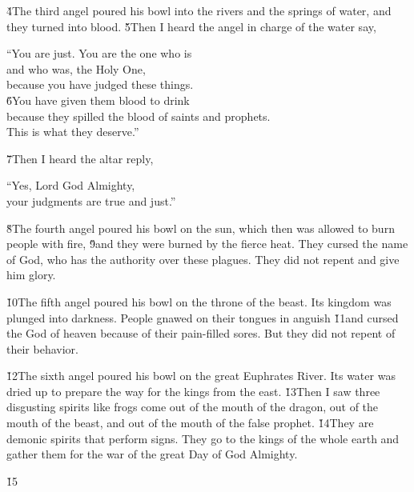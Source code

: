 \v{4}The third angel poured his bowl into the rivers and the springs of water, and they turned into blood. \v{5}Then I heard the angel in charge of the water say,

\begin{poetry}
\poeml ``You are just. You are the one who is \\
\poemll    and who was, the Holy One, \\
\poemlll       because you have judged these things. \\
\poeml \v{6}You have given them blood to drink \\
\poemll    because they spilled the blood of saints and prophets. \\
\poemlll       This is what they deserve.''
\end{poetry}

\v{7}Then I heard the altar reply,

\begin{poetry}
\poeml ``Yes, Lord God Almighty, \\
\poemll    your judgments are true and just.''
\end{poetry}

\v{8}The fourth angel poured his bowl on the sun, which then was allowed to burn people with fire, \v{9}and they were burned by the fierce heat. They cursed the name of God, who has the authority over these plagues. They did not repent and give him glory.

\v{10}The fifth angel poured his bowl on the throne of the beast. Its kingdom was plunged into darkness. People gnawed on their tongues in anguish \v{11}and cursed the God of heaven because of their pain-filled sores. But they did not repent of their behavior.

\v{12}The sixth angel poured his bowl on the great Euphrates River. Its water was dried up to prepare the way for the kings from the east. \v{13}Then I saw three disgusting spirits like frogs come out of the mouth of the dragon, out of the mouth of the beast, and out of the mouth of the false prophet. \v{14}They are demonic spirits that perform signs. They go to the kings of the whole earth and gather them for the war of the great Day of God Almighty.

\begin{poetry}
\poeml \v{15} \\
\poeml {} \\
\poemll    {} \\
\poeml {} \\
\poemll    {}
\end{poetry}

